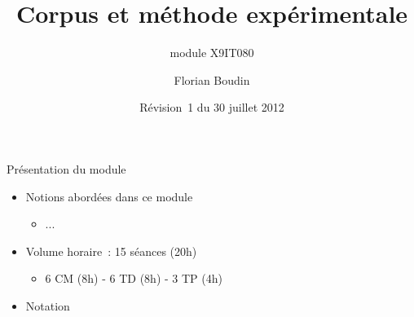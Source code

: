 \documentclass[12pt,aspectratio=43,dvipsnames,table]{beamer}
\title{Corpus et méthode expérimentale}
\subtitle{module X9IT080}
\author{Florian Boudin}
\institute{Département informatique, Université de Nantes}
\date[30 juillet 2013 / Rév.~1]{Révision~1 du 30 juillet 2012}
\begin{document}
\frame[plain]{\titlepage}

\begin{frame}{Présentation du module}
\begin{itemize} \itemsep10pt
    \item Notions abordées dans ce module
	\begin{itemize}
		\item ...
	\end{itemize}
	\item Volume horaire~: 15 séances (20h)
	\begin{itemize}
		\item 6 CM (8h) - 6 TD (8h) - 3 TP (4h)
	\end{itemize}
	\item Notation
\end{itemize}


\end{frame}


\end{document}
